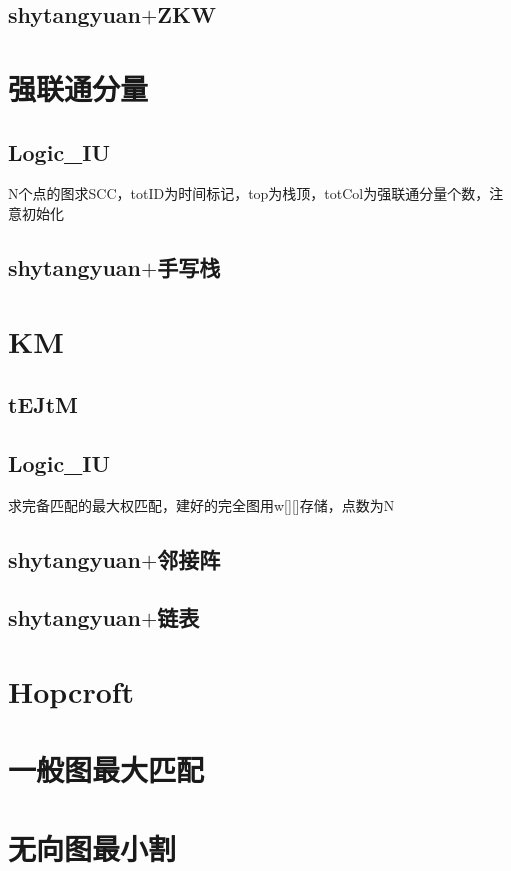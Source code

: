 \documentclass[a4paper,10pt]{book}
\begin{document}
		\subsection{shytangyuan$+$ZKW}
			

	\section{强联通分量}
		\subsection{Logic\_IU}
			N个点的图求SCC，totID为时间标记，top为栈顶，totCol为强联通分量个数，注意初始化
			
		\subsection{shytangyuan$+$手写栈}
			
	
	\section{KM}
		\subsection{tEJtM}
			
        \subsection{Logic\_IU}
	        求完备匹配的最大权匹配，建好的完全图用w[][]存储，点数为N
	        
		\subsection{shytangyuan$+$邻接阵}
			
		\subsection{shytangyuan$+$链表}
			
	\section{Hopcroft}
		
	\section{一般图最大匹配}
		
	\section{无向图最小割}
		
\end{document}
